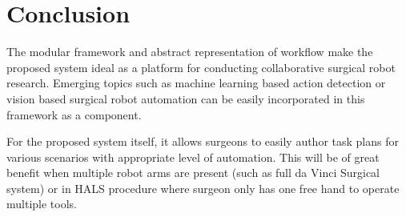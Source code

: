 \documentclass[letterpaper, 10 pt, conference]{ieeeconf}
\begin{document}
\section{Conclusion}
The modular framework and abstract representation of workflow make the proposed system ideal as a platform for conducting collaborative surgical robot research. Emerging topics such as machine learning based action detection or vision based surgical robot automation can be easily incorporated in this framework as a component. 

For the proposed system itself, it allows surgeons to easily author task plans for various scenarios with appropriate level of automation. This will be of great benefit when multiple robot arms are present (such as full da Vinci Surgical system) or in HALS procedure \cite{bauzano2016collaborative} where surgeon only has one free hand to operate multiple tools. 

\addtolength{\textheight}{-12cm}   %







%






\end{document}
